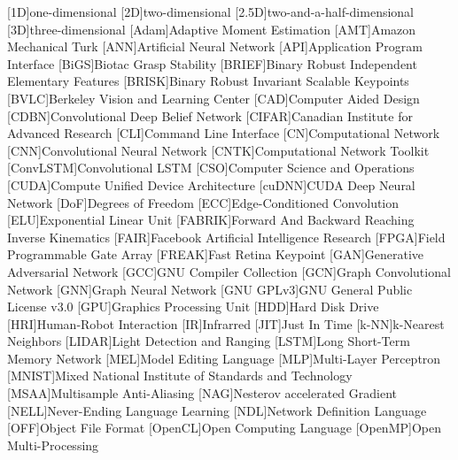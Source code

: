 \begin{acronym}
	[1D]{one-dimensional}
	[2D]{two-dimensional}
	[2.5D]{two-and-a-half-dimensional}
	[3D]{three-dimensional}
	[Adam]{Adaptive Moment Estimation}
	[AMT]{Amazon Mechanical Turk}
	[ANN]{Artificial Neural Network}
    [API]{Application Program Interface}
    [BiGS]{Biotac Grasp Stability}
	[BRIEF]{Binary Robust Independent Elementary Features}
	[BRISK]{Binary Robust Invariant Scalable Keypoints}
	[BVLC]{Berkeley Vision and Learning Center}
	[CAD]{Computer Aided Design}
	[CDBN]{Convolutional Deep Belief Network}
	[CIFAR]{Canadian Institute for Advanced Research}
	[CLI]{Command Line Interface}
	[CN]{Computational Network}
	[CNN]{Convolutional Neural Network}
    [CNTK]{Computational Network Toolkit}
    [ConvLSTM]{Convolutional LSTM}
	[CSO]{Computer Science and Operations}
	[CUDA]{Compute Unified Device Architecture}
    [cuDNN]{CUDA Deep Neural Network}
    [DoF]{Degrees of Freedom}
    [ECC]{Edge-Conditioned Convolution}
    [ELU]{Exponential Linear Unit}
    [FABRIK]{Forward And Backward Reaching Inverse Kinematics}
	[FAIR]{Facebook Artificial Intelligence Research}
    [FPGA]{Field Programmable Gate Array}
    [FREAK]{Fast Retina Keypoint}
    [GAN]{Generative Adversarial Network}
    [GCC]{GNU Compiler Collection}
    [GCN]{Graph Convolutional Network}
    [GNN]{Graph Neural Network}
	[GNU GPLv3]{GNU General Public License v3.0}
	[GPU]{Graphics Processing Unit}
    [HDD]{Hard Disk Drive}
    [HRI]{Human-Robot Interaction}
	[IR]{Infrarred}
    [JIT]{Just In Time}
    [k-NN]{k-Nearest Neighbors}
    [LIDAR]{Light Detection and Ranging}
    [LSTM]{Long Short-Term Memory Network}
	[MEL]{Model Editing Language}
	[MLP]{Multi-Layer Perceptron}
    [MNIST]{Mixed National Institute of Standards and Technology}
    [MSAA]{Multisample Anti-Aliasing}
    [NAG]{Nesterov accelerated Gradient}
    [NELL]{Never-Ending Language Learning}
	[NDL]{Network Definition Language}
	[OFF]{Object File Format}
	[OpenCL]{Open Computing Language}
	[OpenMP]{Open Multi-Processing}

\end{acronym}
